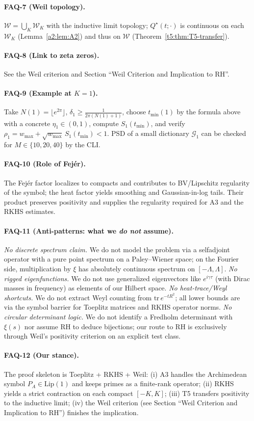 \paragraph{FAQ-7 (Weil topology).} $\mathcal W=\bigcup_K\mathcal W_K$ with the inductive limit topology; $Q^\star(t;\cdot)$ is continuous on each $\mathcal W_K$ (Lemma~\ref{a2:lem:A2}) and thus on $\mathcal W$ (Theorem~\ref{t5:thm:T5-transfer}).
\paragraph{FAQ-8 (Link to zeta zeros).} See the Weil criterion and Section ``Weil Criterion and Implication to RH''.
\paragraph{FAQ-9 (Example at $K=1$).} Take $N(1)=\lfloor e^{2\pi}\rfloor$, $\delta_1\ge \frac{1}{2\pi(N(1)+1)}$, choose $t_{\min}(1)$ by the formula above with a concrete $\eta_1\in(0,1)$, compute $S_1(t_{\min})$, and verify $\rho_1=w_{\max}+\sqrt{w_{\max}}\,S_1(t_{\min})<1$. PSD of a small dictionary $\mathcal G_1$ can be checked for $M\in\{10,20,40\}$ by the CLI.
\paragraph{FAQ-10 (Role of Fej\'er).} The Fej\'er factor localizes to compacts and contributes to BV/Lipschitz regularity of the symbol; the heat factor yields smoothing and Gaussian-in-log tails. Their product preserves positivity and supplies the regularity required for A3 and the RKHS estimates.

\paragraph{FAQ-11 (Anti-patterns: what we \emph{do not} assume).}
\emph{No discrete spectrum claim.} We do not model the problem via a selfadjoint operator with a pure point spectrum on a Paley--Wiener space; on the Fourier side, multiplication by $\xi$ has absolutely continuous spectrum on $[-\Lambda,\Lambda]$.
\emph{No rigged eigenfunctions.} We do not use generalized eigenvectors like $e^{i\gamma \tau}$ (with Dirac masses in frequency) as elements of our Hilbert space.
\emph{No heat-trace/Weyl shortcuts.} We do not extract Weyl counting from $\mathrm{tr}\,e^{-tR^2}$; all lower bounds are via the symbol barrier for Toeplitz matrices and RKHS operator norms.
\emph{No circular determinant logic.} We do not identify a Fredholm determinant with $\xi(s)$ nor assume RH to deduce bijections; our route to RH is exclusively through Weil's positivity criterion on an explicit test class.

\paragraph{FAQ-12 (Our stance).} The proof skeleton is Toeplitz + RKHS + Weil: (i) A3 handles the Archimedean symbol $P_A\in\mathrm{Lip}(1)$ and keeps primes as a finite-rank operator; (ii) RKHS yields a strict contraction on each compact $[-K,K]$; (iii) T5 transfers positivity to the inductive limit; (iv) the Weil criterion (see Section ``Weil Criterion and Implication to RH'') finishes the implication.

